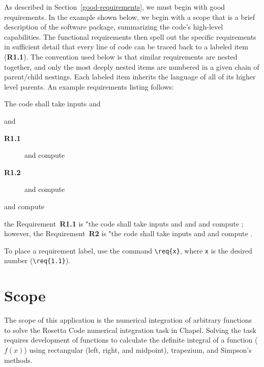 \label{Requirements}

\begin{seamlessnote}
  As described in Section~\ref{good-requirements}, we must begin with good requirements. In the example shown below,
  we begin with a scope that is a brief description of the software package, summarizing the code's high-level
  capabilities. The functional requirements then spell out the specific requirements in sufficient detail that 
  every line of code can be traced back to a labeled item (\eg \textbf{R1.1}). The convention used below is that
  similar requirements are nested together, and only the most deeply nested items are numbered in a given
  chain of parent/child nestings. Each labeled item inherits the language of all of its higher level parents.
  An example requirements listing follows:
  \begin{description}
    \item The code shall take inputs  and 
      \begin{description}
        \item and 
          \begin{description}
            \item[\textbf{R1.1}] and compute 
            \item[\textbf{R1.2}] and compute 
          \end{description}
        \item[\textbf{R2}] and compute 
      \end{description}
  \end{description}
  the Requirement~\textbf{R1.1} is "the code shall take inputs  and  and 
  and compute ; however, the Requirement~\textbf{R2} is "the code shall take 
  inputs  and  and compute .

  To place a requirement label, use the command \lstinline!\req{x}!, where \texttt{x} is the desired 
  number (\eg \lstinline!\req{1.1}!).
\end{seamlessnote}


\section{Scope}
\label{Scope}

The scope of this application is the numerical integration of arbitrary functions 
to solve the Rosetta Code numerical integration task\cite{rosetta-code-numerical-integration}
in Chapel. Solving the task requires development of functions to calculate the definite 
integral of a function ($f(x)$) using rectangular (left, right, and midpoint), trapezium, and Simpson's methods.

